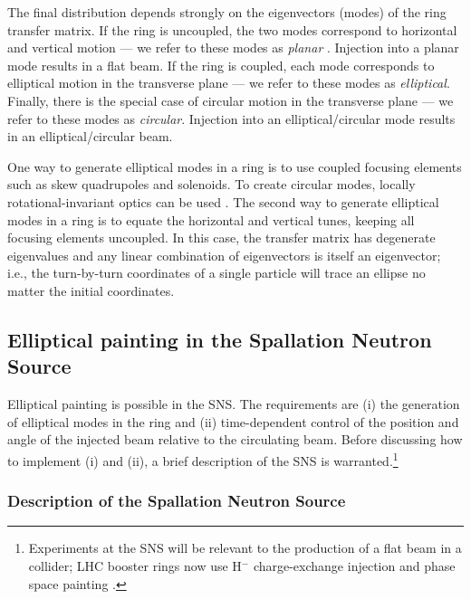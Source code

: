 The final distribution depends strongly on the eigenvectors (modes) of the ring transfer matrix. If the ring is uncoupled, the two modes correspond to horizontal and vertical motion — we refer to these modes as \textit{planar} \cite{Burov2002}. Injection into a planar mode results in a flat beam. If the ring is coupled, each mode corresponds to elliptical motion in the transverse plane — we refer to these modes as \textit{elliptical}. Finally, there is the special case of circular motion in the transverse plane — we refer to these modes as \textit{circular}. Injection into an elliptical/circular mode results in an elliptical/circular beam.

One way to generate elliptical modes in a ring is to use coupled focusing elements such as skew quadrupoles and solenoids. To create circular modes, locally rotational-invariant optics can be used \cite{Burov2002}. The second way to generate elliptical modes in a ring is to equate the horizontal and vertical tunes, keeping all focusing elements uncoupled. In this case, the transfer matrix has degenerate eigenvalues and any linear combination of eigenvectors is itself an eigenvector; i.e., the turn-by-turn coordinates of a single particle will trace an ellipse no matter the initial coordinates. 


\subsection{Elliptical painting in the Spallation Neutron Source}

Elliptical painting is possible in the SNS. The requirements are (i) the generation of elliptical modes in the ring and (ii) time-dependent control of the position and angle of the injected beam relative to the circulating beam. Before discussing how to implement (i) and (ii), a brief description of the SNS is warranted.\footnote{Experiments at the SNS will be relevant to the production of a flat beam in a collider; LHC booster rings now use H$^-$ charge-exchange injection and phase space painting \cite{Abelleira2015, Bracco2011}.}


\subsubsection{Description of the Spallation Neutron Source}

